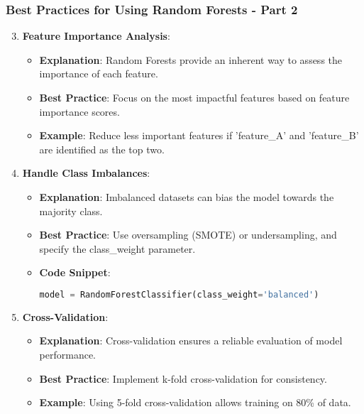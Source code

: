 \documentclass[aspectratio=169]{beamer}
\begin{document}
\begin{frame}[fragile]
    \frametitle{Best Practices for Using Random Forests - Part 2}
    \begin{enumerate}
        \setcounter{enumi}{2} %
        \item \textbf{Feature Importance Analysis}:
        \begin{itemize}
            \item \textbf{Explanation}: Random Forests provide an inherent way to assess the importance of each feature.
            \item \textbf{Best Practice}: Focus on the most impactful features based on feature importance scores.
            \item \textbf{Example}: Reduce less important features if 'feature\_A' and 'feature\_B' are identified as the top two.
        \end{itemize}
        
        \item \textbf{Handle Class Imbalances}:
        \begin{itemize}
            \item \textbf{Explanation}: Imbalanced datasets can bias the model towards the majority class.
            \item \textbf{Best Practice}: Use oversampling (SMOTE) or undersampling, and specify the class\_weight parameter.
            \item \textbf{Code Snippet}:
            \begin{lstlisting}[language=Python]
model = RandomForestClassifier(class_weight='balanced')
            \end{lstlisting}
        \end{itemize}
        
        \item \textbf{Cross-Validation}:
        \begin{itemize}
            \item \textbf{Explanation}: Cross-validation ensures a reliable evaluation of model performance.
            \item \textbf{Best Practice}: Implement k-fold cross-validation for consistency.
            \item \textbf{Example}: Using 5-fold cross-validation allows training on 80\% of data.
        \end{itemize}
    \end{enumerate}
\end{frame}
\end{document}

